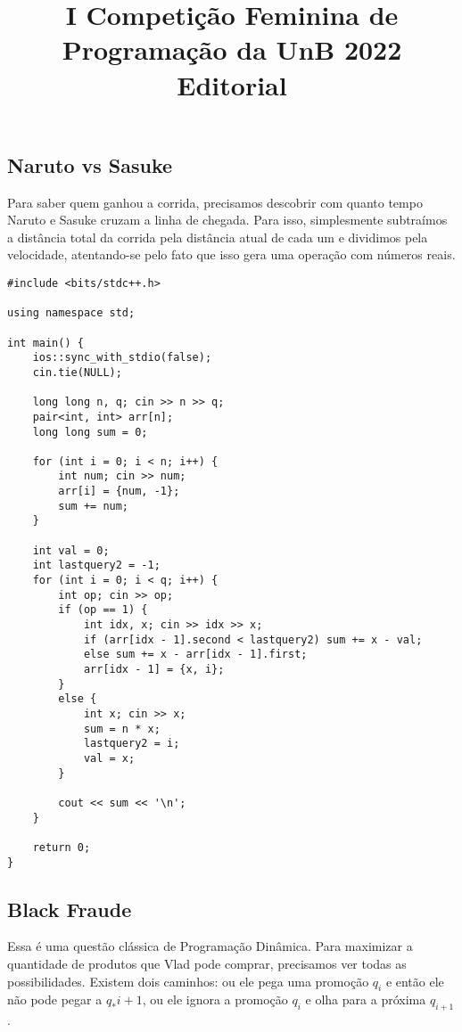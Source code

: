 \documentclass[11pt,fancychapters]{article}
\title{I Competição Feminina de Programação da UnB 2022 \\ Editorial}
\date{}
\begin{document}
\maketitle
{}
\newpage
{}
\tableofcontents
\newpage
{}

\begin{center}\section{Naruto vs Sasuke}\end{center}
\noindent
Para saber quem ganhou a corrida, precisamos descobrir com quanto tempo Naruto e Sasuke cruzam a linha de chegada. Para isso, simplesmente subtraímos a distância total da corrida pela distância atual de cada um e dividimos pela velocidade, atentando-se pelo fato que isso gera uma operação com números reais.\\
\begin{lstlisting}[style=c++]
#include <bits/stdc++.h>

using namespace std;

int main() {
    ios::sync_with_stdio(false);
    cin.tie(NULL);
    
    long long n, q; cin >> n >> q;
    pair<int, int> arr[n];
    long long sum = 0;
    
    for (int i = 0; i < n; i++) {
        int num; cin >> num;
        arr[i] = {num, -1};
        sum += num;
    }
    
    int val = 0;
    int lastquery2 = -1;
    for (int i = 0; i < q; i++) {
        int op; cin >> op;
        if (op == 1) {
            int idx, x; cin >> idx >> x;
            if (arr[idx - 1].second < lastquery2) sum += x - val;
            else sum += x - arr[idx - 1].first;
            arr[idx - 1] = {x, i};
        }
        else {
            int x; cin >> x;
            sum = n * x;
            lastquery2 = i;
            val = x;
        }
        
        cout << sum << '\n';
    }

    return 0;
}
\end{lstlisting}
\newpage
\begin{center}\section{Black Fraude}\end{center}
\noindent
Essa é uma questão clássica de Programação Dinâmica. Para maximizar a quantidade de produtos que Vlad pode comprar, precisamos ver todas as possibilidades. Existem dois caminhos: ou ele pega uma promoção $q_i$ e então ele não pode pegar a $q_*{i+1}$, ou ele ignora a promoção $q_i$ e olha para a próxima $q_{i+1}$.\\
\end{document}
